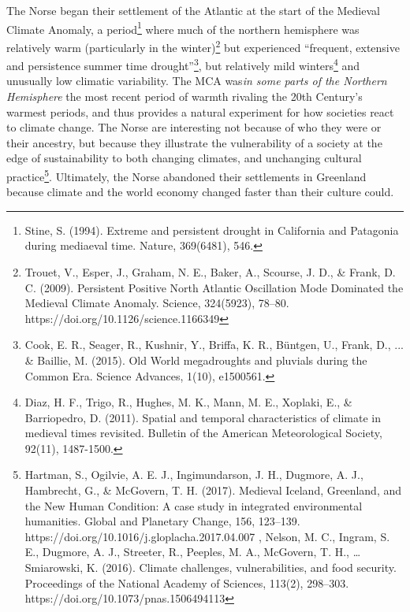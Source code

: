 \documentclass[amstex,12pt]{book}
\begin{document}
The Norse began their settlement of the Atlantic at the start of the Medieval Climate Anomaly, a period\footnote{Stine, S. (1994). Extreme and persistent drought in California and Patagonia during mediaeval time. Nature, 369(6481), 546.} where much of the northern hemisphere was relatively warm (particularly in the winter)\footnote{Trouet, V., Esper, J., Graham, N. E., Baker, A., Scourse, J. D., \& Frank, D. C. (2009). Persistent Positive North Atlantic Oscillation Mode Dominated the Medieval Climate Anomaly. Science, 324(5923), 78–80. https://doi.org/10.1126/science.1166349} but experienced ``frequent, extensive and persistence summer time drought''\footnote{Cook, E. R., Seager, R., Kushnir, Y., Briffa, K. R., Büntgen, U., Frank, D., ... \& Baillie, M. (2015). Old World megadroughts and pluvials during the Common Era. Science Advances, 1(10), e1500561.}, but relatively mild winters\footnote{Diaz, H. F., Trigo, R., Hughes, M. K., Mann, M. E., Xoplaki, E., \& Barriopedro, D. (2011). Spatial and temporal characteristics of climate in medieval times revisited. Bulletin of the American Meteorological Society, 92(11), 1487-1500.} and unusually low climatic variability. The MCA was\emph{in some parts of the Northern Hemisphere} the most recent period of warmth rivaling the 20th Century's warmest periods, and thus provides a natural experiment for how societies react to climate change. The Norse are interesting not because of who they were or their ancestry, but because they illustrate the vulnerability of a society at the edge of sustainability to both changing climates, and unchanging cultural practice\footnote{Hartman, S., Ogilvie, A. E. J., Ingimundarson, J. H., Dugmore, A. J., Hambrecht, G., \& McGovern, T. H. (2017). Medieval Iceland, Greenland, and the New Human Condition: A case study in integrated environmental humanities. Global and Planetary Change, 156, 123–139. https://doi.org/10.1016/j.gloplacha.2017.04.007
, Nelson, M. C., Ingram, S. E., Dugmore, A. J., Streeter, R., Peeples, M. A., McGovern, T. H., … Smiarowski, K. (2016). Climate challenges, vulnerabilities, and food security. Proceedings of the National Academy of Sciences, 113(2), 298–303. https://doi.org/10.1073/pnas.1506494113}. Ultimately, the Norse abandoned their settlements in Greenland because climate and the world economy changed faster than their culture could. \\
\end{document}
